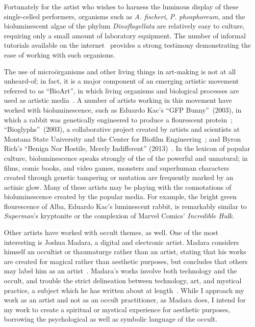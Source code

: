 \documentclass[a4paper,nobib]{tufte-handout}
\begin{document}
Fortunately for the artist who wishes to harness the luminous display of these single-celled performers, organisms such as \textit{A. fischeri}, \textit{P. phosphoreum}, and the bioluminescent algae of the phylum \textit{Dinoflagellata} are relatively easy to culture, requiring only a small amount of laboratory equipment. The number of informal tutorials available on the internet~\autocite{instructablesLightbulb,instructablesAlgae,instructablesFountain} provides a strong testimony demonstrating the ease of working with such organisms.

The use of micro{\"o}rganisms and other living things in art-making is not at all unheard-of; in fact, it is a major component of an emerging artistic movement referred to as ``BioArt'', in which living organisms and biological processes are used as artistic media~\autocite{anker2004molecular,pentecost2008outfitting}. A number of artists working in this movement have worked with bioluminescence, such as Eduardo Kac's ``GFP Bunny''~(2003), in which a rabbit was genetically engineered to produce a flourescent protein~\autocite{kac2003gfp}; ``Bioglyphs''~(2003), a collaborative project created by artists and scientists at Montana State University and the Center for Biofilm Engineering~\autocite{petkewich2003scientist,bioglyphs}; and Byron Rich's ``Benign Nor Hostile, Merely Indifferent'' (2013)~\autocite{benignNorHostile}. In the lexicon of popular culture, bioluminescence speaks strongly of the of the powerful and unnatural; in films, comic books, and video games, monsters and superhuman characters created through genetic tampering or mutation are frequently marked by an actinic glow. Many of these artists may be playing with the connotations of bioluminescence created by the popular media. For example, the bright green flourescence of Alba, Eduardo Kac's luminescent rabbit, is remarkably similar to \textit{Superman}'s kryptonite or the complexion of Marvel Comics' \textit{Incredible Hulk}.

Other artists have worked with occult themes, as well. One of the most interesting is Joshua Madara, a digital and electronic artist. Madara considers himself an occultist or thaumaturge rather than an artist, stating that his works are created for magical rather than aesthetic purposes, but concludes that others may label him as an artist~\autocite{madara}. Madara's works involve both technology and the occult, and trouble the strict delineation between technology, art, and mystical practice, a subject which he has written about at length~\autocite{madarabeing,madaramagic}. While I approach my work as an artist and not as an occult practitioner, as Madara does, I intend for my work to create a spiritual or mystical experience for aesthetic purposes, borrowing the psychological as well as symbolic language of the occult.
\end{document}
